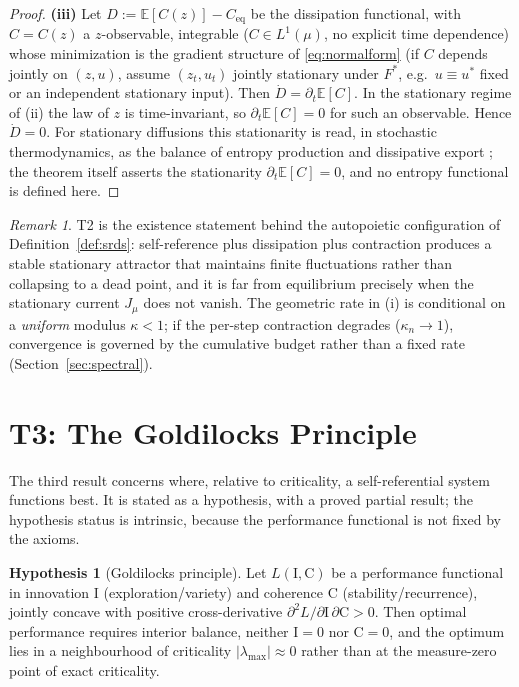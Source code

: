 \documentclass[11pt]{article}
\theoremstyle{plain}
\theoremstyle{definition}
\newtheorem{hypothesis}[theorem]{Hypothesis}
\theoremstyle{remark}
\newtheorem{remark}[theorem]{Remark}
\newcommand{\E}{\mathbb{E}}
\newcommand{\abs}[1]{\left\lvert#1\right\rvert}
\begin{document}
\begin{proof}
\textbf{(iii)} Let $D:=\E[C(z)]-C_{\mathrm{eq}}$ be the dissipation functional, with $C=C(z)$ a $z$-observable, integrable ($C\in L^1(\mu)$, no explicit time dependence) whose minimization is the gradient structure of \eqref{eq:normalform} (if $C$ depends jointly on $(z,u)$, assume $(z_t,u_t)$ jointly stationary under $F^*$, e.g.\ $u\equiv u^*$ fixed or an independent stationary input). Then $\dot D=\partial_t\E[C]$. In the stationary regime of (ii) the law of $z$ is time-invariant, so $\partial_t\E[C]=0$ for such an observable. Hence $\dot D=0$. For stationary diffusions this stationarity is read, in stochastic thermodynamics, as the balance of entropy production and dissipative export \citep{prigogine1977}; the theorem itself asserts the stationarity $\partial_t\E[C]=0$, and no entropy functional is defined here.
\end{proof}

\begin{remark}
T2 is the existence statement behind the autopoietic configuration of Definition~\ref{def:srds}: self-reference plus dissipation plus contraction produces a stable stationary attractor that maintains finite fluctuations rather than collapsing to a dead point, and it is far from equilibrium precisely when the stationary current $J_\mu$ does not vanish. The geometric rate in (i) is conditional on a \emph{uniform} modulus $\kappa<1$; if the per-step contraction degrades ($\kappa_n\to1$), convergence is governed by the cumulative budget rather than a fixed rate (Section~\ref{sec:spectral}).
\end{remark}

\section{T3: The Goldilocks Principle}\label{sec:t3}

The third result concerns where, relative to criticality, a self-referential system functions best. It is stated as a hypothesis, with a proved partial result; the hypothesis status is intrinsic, because the performance functional is not fixed by the axioms.

\begin{hypothesis}[Goldilocks principle]\label{hyp:goldi}
Let $L(\mathrm{I},\mathrm{C})$ be a performance functional in innovation $\mathrm{I}$ (exploration/variety) and coherence $\mathrm{C}$ (stability/recurrence), jointly concave with positive cross-derivative $\partial^2 L/\partial\mathrm{I}\,\partial\mathrm{C}>0$. Then optimal performance requires interior balance, neither $\mathrm{I}=0$ nor $\mathrm{C}=0$, and the optimum lies in a neighbourhood of criticality $\abs{\lambda_{\max}}\approx0$ rather than at the measure-zero point of exact criticality.
\end{hypothesis}
\end{document}
